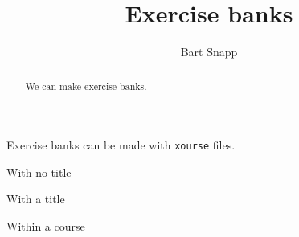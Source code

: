 \documentclass{ximera}
\title{Exercise banks}
\author{Bart Snapp}
\begin{document}
\begin{abstract}
We can make exercise banks.
\end{abstract}
\maketitle

Exercise banks can be made with \verb!xourse! files. 

With no title

With a title

Within a course
\end{document}
